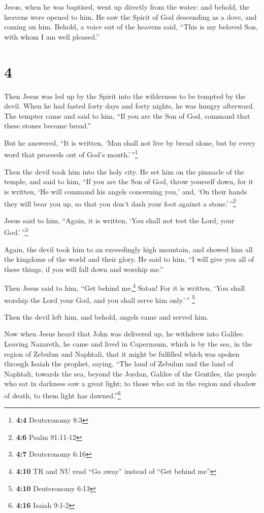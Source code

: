  Jesus, when he was baptised, went up directly from the
water: and behold, the heavens were opened to him. He saw the Spirit of
God descending as a dove, and coming on him.  Behold, a
voice out of the heavens said, ``This is my beloved Son, with whom I am
well pleased.''

\hypertarget{section-3}{%
\section{4}\label{section-3}}

 Then Jesus was led up by the Spirit into the wilderness
to be tempted by the devil.  When he had fasted forty days
and forty nights, he was hungry afterward.  The tempter
came and said to him, ``If you are the Son of God, command that these
stones become bread.''

 But he answered, ``It is written, `Man shall not live by
bread alone, but by every word that proceeds out of God's
mouth.'\,''\footnote{\textbf{4:4} Deuteronomy 8:3}

 Then the devil took him into the holy city. He set him on
the pinnacle of the temple,  and said to him, ``If you are
the Son of God, throw yourself down, for it is written, `He will command
his angels concerning you,' and, `On their hands they will bear you up,
so that you don't dash your foot against a stone.'\,''\footnote{\textbf{4:6}
  Psalm 91:11-12}

 Jesus said to him, ``Again, it is written, `You shall not
test the Lord, your God.'\,''\footnote{\textbf{4:7} Deuteronomy 6:16}

 Again, the devil took him to an exceedingly high
mountain, and showed him all the kingdoms of the world and their glory.
 He said to him, ``I will give you all of these things, if
you will fall down and worship me.''

 Then Jesus said to him, ``Get behind me,\footnote{\textbf{4:10}
  TR and NU read ``Go away'' instead of ``Get behind me''} Satan! For it
is written, `You shall worship the Lord your God, and you shall serve
him only.'\,'' \footnote{\textbf{4:10} Deuteronomy 6:13}

 Then the devil left him, and behold, angels came and
served him.

 Now when Jesus heard that John was delivered up, he
withdrew into Galilee.  Leaving Nazareth, he came and
lived in Capernaum, which is by the sea, in the region of Zebulun and
Naphtali,  that it might be fulfilled which was spoken
through Isaiah the prophet, saying,  ``The land of
Zebulun and the land of Naphtali, towards the sea, beyond the Jordan,
Galilee of the Gentiles,  the people who sat in darkness
saw a great light; to those who sat in the region and shadow of death,
to them light has dawned.''\footnote{\textbf{4:16} Isaiah 9:1-2}

